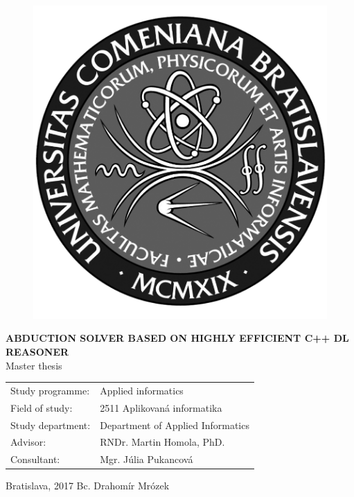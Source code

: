 \documentclass[12pt, a4paper, oneside]{book}
\newcommand\mftitle{Abduction solver based on  highly   efficient C++ DL reasoner}
\newcommand\mfthesistype{Master thesis}
\newcommand\mfauthor{Bc. Drahomír Mrózek}
\newcommand\mfadvisor{RNDr. Martin Homola, PhD.}
\newcommand\mfconsultant{Mgr. Júlia Pukancová}
\newcommand\mfplacedate{Bratislava, 2017}
\begin{document}
\vfill
\begin{figure}[!hbt]
\begin{center}
\includegraphics{images/logo_fmph_dark}
\label{img:logo_dark}
\end{center}
\end{figure}
\begin{center}
{\textbf{\Large\MakeUppercase{\mftitle}}}\\
		\smallskip
		{\mfthesistype}
\end{center}
\vfill
\begin{tabular}{l l}
Study programme: & Applied informatics\\
Field of study: & 2511 Aplikovaná informatika\\
Study department: & Department of Applied Informatics\\
Advisor: &  \mfadvisor \\
Consultant: & \mfconsultant
\end{tabular}
\vfill
\noindent
\mfplacedate \hfill
\mfauthor
\eject 

\end{document}
